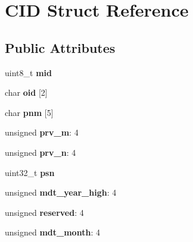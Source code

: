 \hypertarget{struct_c_i_d}{}\section{C\+I\+D Struct Reference}
\label{struct_c_i_d}
\subsection*{Public Attributes}
\begin{DoxyCompactItemize}
\item 
\hypertarget{struct_c_i_d_addb3f98dd20ccc0ffdf300d5ef9c6333}{}uint8\+\_\+t {\bfseries mid}\label{struct_c_i_d_addb3f98dd20ccc0ffdf300d5ef9c6333}

\item 
\hypertarget{struct_c_i_d_a12cb950aa46c62c8af1e530006f97031}{}char {\bfseries oid} \mbox{[}2\mbox{]}\label{struct_c_i_d_a12cb950aa46c62c8af1e530006f97031}

\item 
\hypertarget{struct_c_i_d_a6484cd56fc4bacfa815c12d8682129ba}{}char {\bfseries pnm} \mbox{[}5\mbox{]}\label{struct_c_i_d_a6484cd56fc4bacfa815c12d8682129ba}

\item 
\hypertarget{struct_c_i_d_a7735b6ae8914c4731de30de32c0ac75c}{}unsigned {\bfseries prv\+\_\+m}\+: 4\label{struct_c_i_d_a7735b6ae8914c4731de30de32c0ac75c}

\item 
\hypertarget{struct_c_i_d_a15237f61edb06b3b6dd25b8c1f15280a}{}unsigned {\bfseries prv\+\_\+n}\+: 4\label{struct_c_i_d_a15237f61edb06b3b6dd25b8c1f15280a}

\item 
\hypertarget{struct_c_i_d_ada215f8541fa46078461d8da9574fc5e}{}uint32\+\_\+t {\bfseries psn}\label{struct_c_i_d_ada215f8541fa46078461d8da9574fc5e}

\item 
\hypertarget{struct_c_i_d_a77cd7bf11f5d63fbcb4b2eec2559b645}{}unsigned {\bfseries mdt\+\_\+year\+\_\+high}\+: 4\label{struct_c_i_d_a77cd7bf11f5d63fbcb4b2eec2559b645}

\item 
\hypertarget{struct_c_i_d_a458794d915efa88aef06f5b0612895ac}{}unsigned {\bfseries reserved}\+: 4\label{struct_c_i_d_a458794d915efa88aef06f5b0612895ac}

\item 
\hypertarget{struct_c_i_d_a8b0c4317cc18c03335d7cde147aa8e8d}{}unsigned {\bfseries mdt\+\_\+month}\+: 4\label{struct_c_i_d_a8b0c4317cc18c03335d7cde147aa8e8d}


\end{DoxyCompactItemize}
